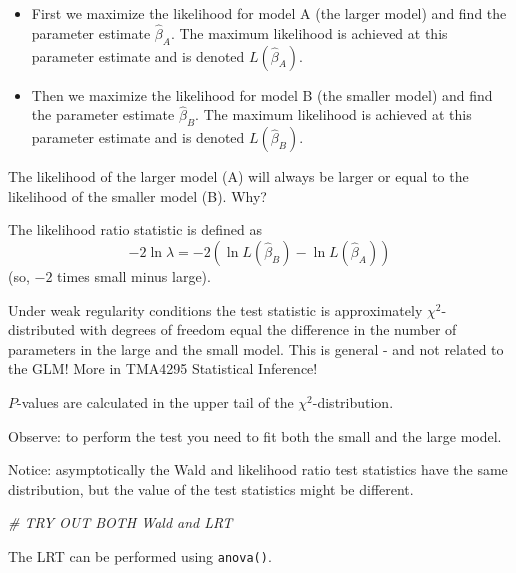 \documentclass[
  ignorenonframetext,
]{beamer}
\newenvironment{Shaded}{\begin{snugshade}}{\end{snugshade}}
\newcommand{\CommentTok}[1]{\textcolor[rgb]{0.56,0.35,0.01}{\textit{#1}}}
\providecommand{\tightlist}{%
  \setlength{\itemsep}{0pt}\setlength{\parskip}{0pt}}
\begin{document}
\begin{frame}
\begin{itemize}
\tightlist
\item
  First we maximize the likelihood for model A (the larger model) and
  find the parameter estimate \(\hat{\beta}_A\). The maximum likelihood
  is achieved at this parameter estimate and is denoted
  \(L(\hat{\beta}_A)\).
\item
  Then we maximize the likelihood for model B (the smaller model) and
  find the parameter estimate \(\hat{\beta}_B\). The maximum likelihood
  is achieved at this parameter estimate and is denoted
  \(L(\hat{\beta}_B)\).
\end{itemize}

The likelihood of the larger model (A) will always be larger or equal to
the likelihood of the smaller model (B). Why?
\end{frame}

\begin{frame}
The likelihood ratio statistic is defined as
\[- 2\ln \lambda=-2(\ln L(\hat{\beta}_B)-\ln L(\hat{\beta}_A)) \] (so,
\(-2\) times small minus large).

Under weak regularity conditions the test statistic is approximately
\(\chi^2\)-distributed with degrees of freedom equal the difference in
the number of parameters in the large and the small model. This is
general - and not related to the GLM! More in TMA4295 Statistical
Inference!

\(P\)-values are calculated in the upper tail of the
\(\chi^2\)-distribution.

Observe: to perform the test you need to fit both the small and the
large model.
\end{frame}

\begin{frame}[fragile]
Notice: asymptotically the Wald and likelihood ratio test statistics
have the same distribution, but the value of the test statistics might
be different.

\begin{Shaded}
\begin{Highlighting}[]
\CommentTok{\# TRY OUT BOTH Wald and LRT}
\end{Highlighting}
\end{Shaded}

The LRT can be performed using \texttt{anova()}.
\end{frame}
\end{document}
